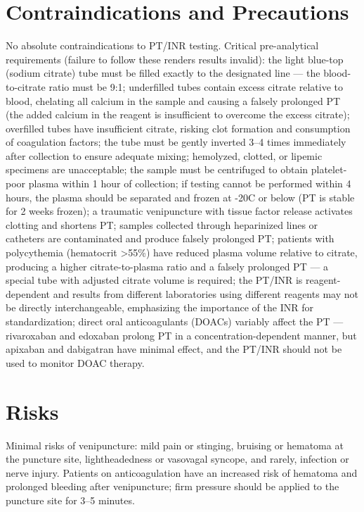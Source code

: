\section*{Contraindications and Precautions}
No absolute contraindications to PT/INR testing. Critical pre-analytical requirements (failure to follow these renders results invalid): the light blue-top (sodium citrate) tube must be filled exactly to the designated line --- the blood-to-citrate ratio must be 9:1; underfilled tubes contain excess citrate relative to blood, chelating all calcium in the sample and causing a falsely prolonged PT (the added calcium in the reagent is insufficient to overcome the excess citrate); overfilled tubes have insufficient citrate, risking clot formation and consumption of coagulation factors; the tube must be gently inverted 3--4 times immediately after collection to ensure adequate mixing; hemolyzed, clotted, or lipemic specimens are unacceptable; the sample must be centrifuged to obtain platelet-poor plasma within 1 hour of collection; if testing cannot be performed within 4 hours, the plasma should be separated and frozen at -20\textdegree{}C or below (PT is stable for 2 weeks frozen); a traumatic venipuncture with tissue factor release activates clotting and shortens PT; samples collected through heparinized lines or catheters are contaminated and produce falsely prolonged PT; patients with polycythemia (hematocrit >55\%) have reduced plasma volume relative to citrate, producing a higher citrate-to-plasma ratio and a falsely prolonged PT --- a special tube with adjusted citrate volume is required; the PT/INR is reagent-dependent and results from different laboratories using different reagents may not be directly interchangeable, emphasizing the importance of the INR for standardization; direct oral anticoagulants (DOACs) variably affect the PT --- rivaroxaban and edoxaban prolong PT in a concentration-dependent manner, but apixaban and dabigatran have minimal effect, and the PT/INR should not be used to monitor DOAC therapy.

\section*{Risks}
Minimal risks of venipuncture: mild pain or stinging, bruising or hematoma at the puncture site, lightheadedness or vasovagal syncope, and rarely, infection or nerve injury. Patients on anticoagulation have an increased risk of hematoma and prolonged bleeding after venipuncture; firm pressure should be applied to the puncture site for 3--5 minutes.

